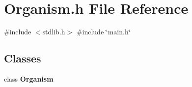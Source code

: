 \section{Organism.\+h File Reference}
\label{Organism_8h}
{\ttfamily \#include $<$stdlib.\+h$>$}\newline
{\ttfamily \#include \char`\"{}main.\+h\char`\"{}}\newline
\subsection*{Classes}
\begin{DoxyCompactItemize}
\item 
class \textbf{ Organism}
\end{DoxyCompactItemize}

